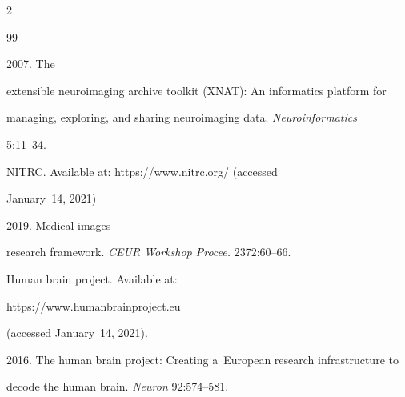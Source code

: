   \begin{multicols}{2}



\renewcommand{\bibname}{\protect\rmfamily References}




{\small\frenchspacing

 {%


 \begin{thebibliography}{99}

 

 \vspace*{-3pt}

 


 2007. The 

extensible neuroimaging archive toolkit (XNAT): An informatics platform for 

managing, exploring, and sharing neuroimaging data. \textit{Neuroinformatics} 

5:11--34.


NITRC. Available at: {\sf https://www.nitrc.org/} (accessed 

January~14, 2021)




 2019. Medical images 

research framework. \textit{CEUR Workshop Procee.} 2372:60--66. 


Human brain project. Available at: {\sf 

https://www.\linebreak humanbrainproject.eu} (accessed January~14, 2021).





2016. The human brain project: Creating a~European research infrastructure to 

decode the human brain. \textit{Neuron} 92:574--581.




\end{thebibliography}}}
\end{multicols}
